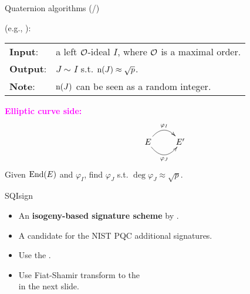\begin{frame}{Quaternion algorithms (/\algquatotal{})}

    {\large
    }
    (e.g., \cite[Algorithm 2.7.5]{Cohen2010_ccnt}):\\[5pt]
    \begin{tabular}{l l}
        \textbf{Input}: & a left $\mathcal{O}$-ideal $I$,
                            where $\mathcal{O}$ is a maximal order.\\[3pt]
        \textbf{Output}: & $J \sim I$ s.t. $\mathrm{n}(J) \approx \sqrt{p}$.\\[3pt]
        \textbf{Note}: & 
                $\mathrm{n}(J)$ can be seen as a random integer.
    \end{tabular}

    \vspace{15pt}
    \textcolor{magenta}{\textbf{Elliptic curve side:}}
    \begin{align*}
        \xymatrix{
            & E \ar@/^15pt/[r]^{\varphi_I} \ar@/_15pt/[r]_{\varphi_J}
            & E'
        }
    \end{align*}
    Given $\mathrm{End}(E)$ and $\varphi_I$,
    find $\varphi_J$ s.t. $\deg\varphi_J \approx \sqrt{p}$.
\end{frame}

\begin{frame}{SQIsign}
    \begin{itemize}
        \setlength{\itemsep}{10pt}
        \item An \textbf{isogeny-based signature scheme} by \cite{AC:DKLPW20}.
        \item A candidate for the NIST PQC additional signatures.
        \item Use the .
        \item Use Fiat-Shamir transform to the \\ in the next slide.
    \end{itemize}
\end{frame}

